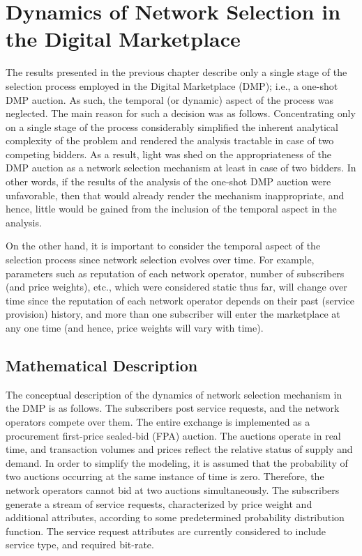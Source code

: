 \chapter{Dynamics of Network Selection in the Digital Marketplace} %
\label{cha:dynamics_of_network_selection_in_the_digital_marketplace}

\minitoc
\vspace{10mm}

The results presented in the previous chapter describe only a single stage of the selection process employed in the Digital Marketplace (DMP); i.e., a one-shot DMP auction. As such, the temporal (or dynamic) aspect of the process was neglected. The main reason for such a decision was as follows. Concentrating only on a single stage of the process considerably simplified the inherent analytical complexity of the problem and rendered the analysis tractable in case of two competing bidders. As a result, light was shed on the appropriateness of the DMP auction as a network selection mechanism at least in case of two bidders. In other words, if the results of the analysis of the one-shot DMP auction were unfavorable, then that would already render the mechanism inappropriate, and hence, little would be gained from the inclusion of the temporal aspect in the analysis.

On the other hand, it is important to consider the temporal aspect of the selection process since network selection evolves over time. For example, parameters such as reputation of each network operator, number of subscribers (and price weights), etc., which were considered static thus far, will change over time since the reputation of each network operator depends on their past (service provision) history, and more than one subscriber will enter the marketplace at any one time (and hence, price weights will vary with time).

\section{Mathematical Description} %
\label{sec:mathematical_description_dynamic}
The conceptual description of the dynamics of network selection mechanism in the DMP is as follows. The subscribers post service requests, and the network operators compete over them. The entire exchange is implemented as a procurement first-price sealed-bid (FPA) auction. The auctions operate in real time, and transaction volumes and prices reflect the relative status of supply and demand. In order to simplify the modeling, it is assumed that the probability of two auctions occurring at the same instance of time is zero. Therefore, the network operators cannot bid at two auctions simultaneously. The subscribers generate a stream of service requests, characterized by price weight and additional attributes, according to some predetermined probability distribution function. The service request attributes are currently considered to include service type, and required bit-rate.

